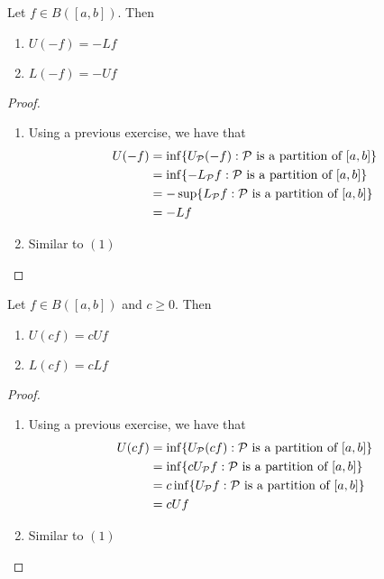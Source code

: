 \documentclass{book}
\begin{document}
	\begin{ex}  
		Let $f \in B([a,b])$. Then 
		\begin{enumerate}
			\item $U(-f) = -Lf$
			\item $L(-f) = -Uf$
		\end{enumerate}
	\end{ex}

	\begin{proof} \
		\begin{enumerate}
			\item Using a previous exercise, we have that
			\begin{align*}
				U(-f)
				&= \inf \{U_{\mathcal{P}}(-f): \mathcal{P} \text{ is a partition of } [a,b]\} \\
				&= \inf \{ -L_{\mathcal{P}} f: \mathcal{P} \text{ is a partition of } [a,b]\} \\
				&= - \sup \{L_{\mathcal{P}} f: \mathcal{P} \text{ is a partition of } [a,b]\} \\
				&= - Lf
			\end{align*}
			\item Similar to $(1)$
		\end{enumerate}
	\end{proof}

	\begin{ex}  
		Let $f \in B([a,b])$ and $c \geq 0$. Then 
		\begin{enumerate}
			\item $U (cf) = c U f$ 
			\item $L (cf) = c L f $
		\end{enumerate}
	\end{ex}
	
	\begin{proof}\
		\begin{enumerate}
			\item Using a previous exercise, we have that
			\begin{align*}
				U(cf) 
				&= \inf \{U_{\mathcal{P}} (cf): \mathcal{P} \text{ is a partition of } [a,b]\} \\
				&= \inf \{c U_{\mathcal{P}} f: \mathcal{P} \text{ is a partition of } [a,b]\} \\
				&= c \inf \{U_{\mathcal{P}} f: \mathcal{P} \text{ is a partition of } [a,b]\} \\
				&= c Uf
			\end{align*}
			\item Similar to $(1)$
		\end{enumerate}
	\end{proof}
\end{document}
